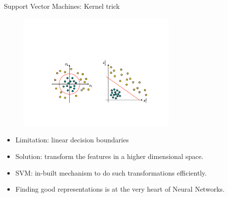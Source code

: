 \documentclass[xcolor=pdftex,dvipsnames,table]{beamer}
\begin{document}

\begin{frame}{Support Vector Machines: Kernel trick}
	\begin{figure}[htb]
		\includegraphics[width=0.7\textwidth]{../graphics/KernelTrick.pdf}
	\end{figure}
	\begin{itemize}
		\item Limitation: linear decision boundaries
		\item Solution: transform the features in a higher dimensional space.
		\item SVM: in-built mechanism to do such transformations efficiently.
		\item Finding good representations is at the very heart of Neural Networks.
	\end{itemize}
\end{frame}
\end{document}

